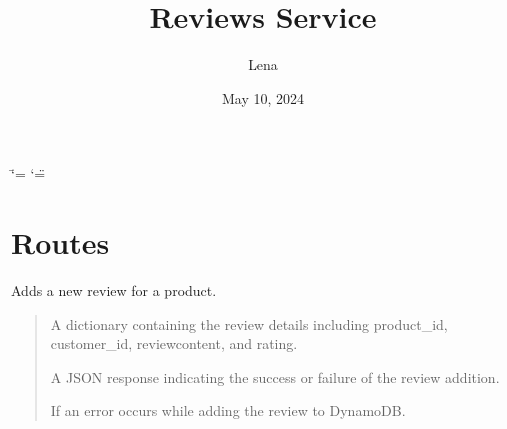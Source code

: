 \documentclass[letterpaper,10pt,english]{sphinxmanual}
\title{Reviews Service}
\date{May 10, 2024}
\author{Lena}
\begin{document}
\ifdefined\shorthandoff
  \ifnum\catcode`\=\string=\active\shorthandoff{=}\fi
  \ifnum\catcode`\"=\active{}\fi
\fi

\pagestyle{empty}
\sphinxmaketitle
\pagestyle{plain}
\sphinxtableofcontents
\pagestyle{normal}
\label{\detokenize{index::doc}}


\sphinxstepscope


\chapter{Routes}
\label{\detokenize{routes_reviews:module-routes_reviews}}\label{\detokenize{routes_reviews:routes}}\label{\detokenize{routes_reviews::doc}}

\begin{fulllineitems}
\label{\detokenize{routes_reviews:routes_reviews.route_add_review}}
\pysigstartsignatures
{}
\pysigstopsignatures
\sphinxAtStartPar
Adds a new review for a product.
\begin{quote}\begin{description}
\sphinxAtStartPar
{} \textendash{} A dictionary containing the review details including product\_id, customer\_id, reviewcontent, and rating.

\sphinxAtStartPar
A JSON response indicating the success or failure of the review addition.

\sphinxAtStartPar
{} \textendash{} If an error occurs while adding the review to DynamoDB.

\end{description}\end{quote}

\end{fulllineitems}

\end{document}
